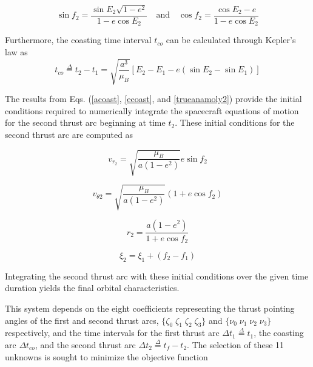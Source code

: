 \begin{equation}
\sin{f_2} = \dfrac{\sin{E_2}\sqrt{1-e^2}}{1-e\cos{E_2}} \quad \text{and} \quad
\cos{f_2} = \dfrac{\cos{E_2}-e}{1-e\cos{E_2}}
\label{trueanamoly2}
\end{equation}

\noindent Furthermore, the coasting time interval $t_{co}$ can be calculated through Kepler's law as
\begin{equation}
t_{co} \overset{\Delta}{=} t_2 - t_1 = \sqrt{\dfrac{a^3}{\mu_B}}[E_2-E_1-e(\sin{E_2}-\sin{E_1})]
\end{equation}

\noindent The results from Eqs. (\ref{acoast}, \ref{ecoast}, and \ref{trueanamoly2}) provide the initial conditions required to numerically integrate 
the spacecraft equations of motion for the second thrust arc beginning at time $t_2$. These initial conditions for the second thrust arc are computed as

\begin{equation}
v_{r_2} = \sqrt{\dfrac{\mu_B}{a(1-e^2)}}e\sin{f_2}
\label{vr2}
\end{equation}

\begin{equation}
    v_{\theta2} = \sqrt{\dfrac{\mu_B}{a(1-e^2)}}(1+e\cos{f_2})
    \label{vtheta2}
\end{equation}

\begin{equation}
r_2 = \dfrac{a(1-e^2)}{1+e\cos{f_2}}
\label{r2}
\end{equation}

\begin{equation}
\xi_2 = \xi_1 + (f_2-f_1)
\end{equation}

\noindent Integrating the second thrust arc with these initial conditions over the given time duration yields the final orbital characteristics. \newline

\noindent This system depends on the eight coefficients representing the thrust pointing angles of the first and second thrust arcs, 
$\{\zeta_0 \; \zeta_1 \; \zeta_2 \; \zeta_3 \}$ and $\{\nu_0 \; \nu_1 \; \nu_2 \; \nu_3 \}$ respectively, and the time intervals for the first thrust arc
$\Delta t_1 \overset{\Delta}{=} t_1$, the coasting arc $\Delta t_{co}$, and the second thrust arc $\Delta t_2 \overset{\Delta}{=} t_f-t_2 $. 
The selection of these 11 unknowns is sought to minimize the objective function 

